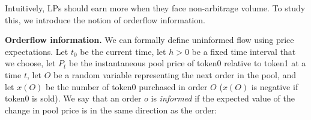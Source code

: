         Intuitively, LPs should earn more when they face non-arbitrage volume. To study this, we introduce the notion of orderflow information.
        



    \textbf{Orderflow information.}
        We can formally define uninformed flow using price expectations. Let $t_0$ be the current time, let $h>0$ be a fixed time interval that we choose, 
        let $P_{t}$ be the instantaneous pool price
        of token0 relative to token1 at a time $t$,
        let $O$ be a random variable representing the next order in the pool, %
        and let $x(O)$ be the number of token0 purchased in order $O$ ($x(O)$ is negative if token0 is sold). We say that an order $o$ is \textit{informed} if the expected value of the change in pool price is in the same direction as the order:
